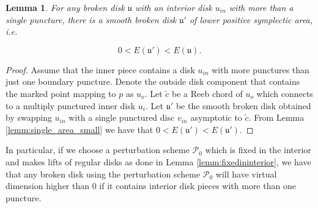 \documentclass[11pt, oneside,dvipsnames]{amsart}
\newcommand{\wt}{\widetilde}
\newcommand{\<}{\langle}
\renewcommand{\>}{\rangle}
\newcommand{\inn}{{in}}
\newcommand{\cP}{\mathcal{P}}
\newcommand{\fu}{\mathfrak{u}}
\newtheorem{lemma}[Theorem]{Lemma}
\theoremstyle{definition}
\theoremstyle{definition}
\numberwithin{equation}{subsection}
\begin{document}
\begin{lemma}\label{lemm:indexlowering}
For any broken disk $\fu$ with an interior disk $u_\inn$ with more than a single puncture, there is a smooth broken disk $\fu'$ of lower positive symplectic area, i.e. 

$$0<E(\fu') < E(\fu).$$
\end{lemma}

\begin{proof}
     Assume that the inner piece contains a disk $u_\inn$ with more punctures than just one boundary puncture. Denote the outside disk component that contains the marked point mapping to $p$ as $u_o$. Let $\wt c$ be a Reeb chord of $u_o$ which connects to a multiply punctured inner disk $u_i$. Let $\fu'$ be the smooth broken disk obtained by swapping $u_\inn$ with a single punctured disc $v_\inn$ asymptotic to $\wt c$. From Lemma \ref{lemm:single_area_small} we have that $0< E(\fu') < E(\fu').$
    

\end{proof}

\noindent In particular, if we choose a perturbation scheme $\cP_0$ which is fixed in the interior and makes lifts of regular disks  as done in Lemma \ref{lemm:fixedininterior}, we have that any broken disk using the perturbation scheme $\cP_0$ will have virtual dimension higher than 0 if it contains interior disk pieces with more than one puncture.
\end{document}
